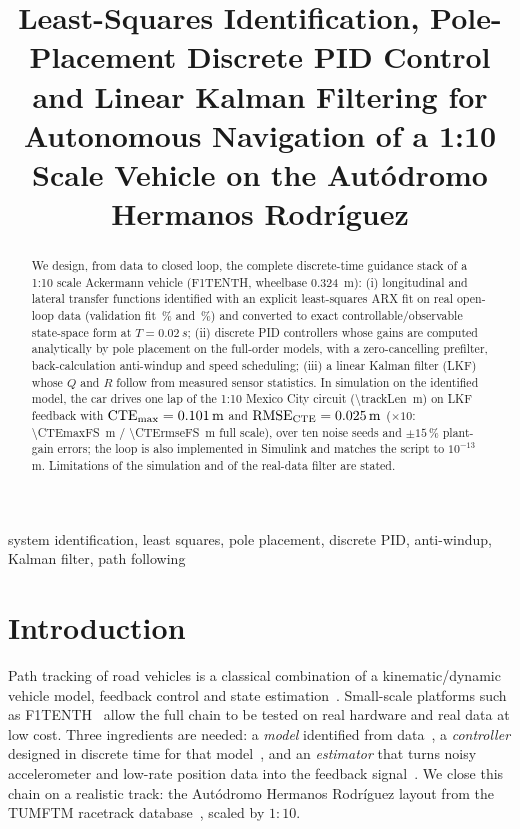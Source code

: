 \documentclass[conference]{IEEEtran}
\begin{document}
\title{Least-Squares Identification, Pole-Placement Discrete PID Control and Linear Kalman Filtering for Autonomous Navigation of a 1:10 Scale Vehicle on the Aut\'odromo Hermanos Rodr\'iguez}

\author{
\and
{}
}

\maketitle

\begin{abstract}
We design, from data to closed loop, the complete discrete-time guidance stack of a 1:10 scale Ackermann vehicle (F1TENTH, wheelbase \SI{0.324}{m}): (i) longitudinal and lateral transfer functions identified with an explicit least-squares ARX fit on real open-loop data (validation fit \fitLonVaFree\,\% and \fitLatVaFree\,\%) and converted to exact controllable/observable state-space form at $T=\SI{0.02}{s}$; (ii) discrete PID controllers whose gains are computed analytically by pole placement on the full-order models, with a zero-cancelling prefilter, back-calculation anti-windup and speed scheduling; (iii) a linear Kalman filter (LKF) whose $Q$ and $R$ follow from measured sensor statistics. In simulation on the identified model, the car drives one lap of the 1:10 Mexico City circuit (\SI{\trackLen}{m}) on LKF feedback with $\mathrm{CTE}_{\max}=\SI{0.101}{m}$ and $\mathrm{RMSE}_{\mathrm{CTE}}=\SI{0.025}{m}$ ($\times10$: \SI{\CTEmaxFS}{m} / \SI{\CTErmseFS}{m} full scale), over ten noise seeds and $\pm15\,\%$ plant-gain errors; the loop is also implemented in Simulink and matches the script to $10^{-13}$\,m. Limitations of the simulation and of the real-data filter are stated.
\end{abstract}

\begin{IEEEkeywords}
system identification, least squares, pole placement, discrete PID, anti-windup, Kalman filter, path following
\end{IEEEkeywords}

\section{Introduction}
Path tracking of road vehicles is a classical combination of a kinematic/dynamic vehicle model, feedback control and state estimation~\cite{rajamani2012}. Small-scale platforms such as F1TENTH~\cite{okelly2020} allow the full chain to be tested on real hardware and real data at low cost. Three ingredients are needed: a \emph{model} identified from data~\cite{ljung1999}, a \emph{controller} designed in discrete time for that model~\cite{astrom1997}, and an \emph{estimator} that turns noisy accelerometer and low-rate position data into the feedback signal~\cite{kalman1960,simon2006}. We close this chain on a realistic track: the Aut\'odromo Hermanos Rodr\'iguez layout from the TUMFTM racetrack database~\cite{heilmeier2020}, scaled by $1{:}10$.
\end{document}
